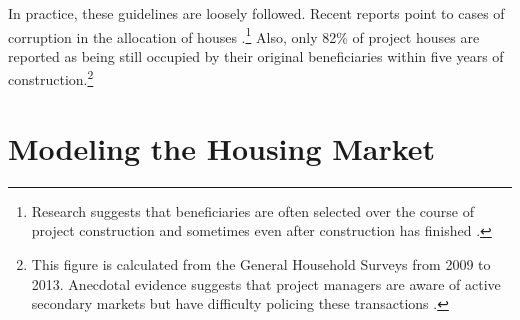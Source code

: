 \documentclass[12pt]{article}
\begin{document}
In practice, these guidelines are loosely followed.  Recent reports point to cases of corruption in the allocation of houses \citep{seriq}.\footnote{Research suggests that beneficiaries are often selected over the course of project construction and sometimes even after construction has finished \citep{seriq}.}  Also, only 82\% of project houses are reported as being still occupied by their original beneficiaries within five years of construction.\footnote{This figure is calculated from the General Household Surveys from 2009 to 2013. Anecdotal evidence suggests that project managers are aware of active secondary markets but have difficulty policing these transactions \citep{resale}.} 





\section{Modeling the Housing Market}\label{section:theory}
\end{document}
